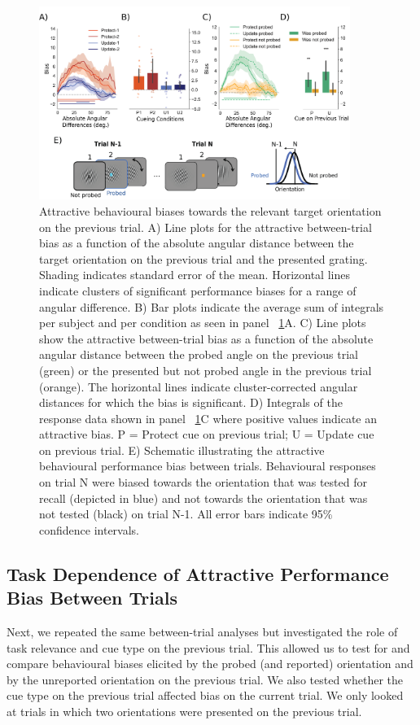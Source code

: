 \documentclass{article}
\begin{document}
\begin{figure}
\centering\includegraphics[width=0.9\textwidth]{figures/figure3_behav_between_trial.png} 
\caption[Attractive behavioural biases towards the relevant target orientation on the previous trial.]{Attractive behavioural biases towards the relevant target orientation on the previous trial. A) Line plots for the attractive between-trial bias as a function of the absolute angular distance between the target orientation on the previous trial and the presented grating. Shading indicates standard error of the mean. Horizontal lines indicate clusters of significant performance biases for a range of angular difference. B) Bar plots indicate the average sum of integrals per subject and per condition as seen in panel ~\ref{fig:behav_attractive}A. C) Line plots show the attractive between-trial bias as a function of the absolute angular distance between the probed angle on the previous trial (green) or the presented but not probed angle in the previous trial (orange). The horizontal lines indicate cluster-corrected angular distances for which the bias is significant. D) Integrals of the response data shown in panel ~\ref{fig:behav_attractive}C where positive values indicate an attractive bias. P = Protect cue on previous trial; U = Update cue on previous trial. E) Schematic illustrating the attractive behavioural performance bias between trials. Behavioural responses on trial N were biased towards the orientation that was tested for recall (depicted in blue) and not towards the orientation that was not tested (black) on trial N-1. All error bars indicate 95\% confidence intervals.}
\label{fig:behav_attractive}\end{figure}


\subsection{Task Dependence of Attractive Performance Bias Between Trials}
Next, we repeated the same between-trial analyses but investigated the role of task relevance and cue type on the previous trial. This allowed us to test for and compare behavioural biases elicited by the probed (and reported) orientation and by the unreported orientation on the previous trial. We also tested whether the cue type on the previous trial affected bias on the current trial. We only looked at trials in which two orientations were presented on the previous trial.
\end{document}
